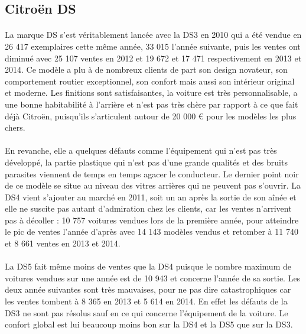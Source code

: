 \documentclass[12pt]{article}\usepackage[]{graphicx}\usepackage[]{color}
\begin{document}
\subsection{Citroën DS}

\paragraph{} La marque DS s'est véritablement lancée avec la DS3 en 2010 qui a
été vendue en 26 417 exemplaires cette même année, 33 015 l'année suivante,
puis les ventes ont diminué avec 25 107 ventes en 2012 et 19 672 et 17 471
respectivement en 2013 et 2014. Ce modèle a plu à de nombreux clients de part
son design novateur\cite{avis}, son comportement routier exceptionnel, son
confort mais aussi son intérieur original et moderne. Les finitions sont
satisfaisantes, la voiture est très personnalisable, a une bonne habitabilité à
l'arrière et n'est pas très chère par rapport à ce que fait déjà Citroën,
puisqu'ils s'articulent autour de 20 000 € pour les modèles les plus chers.

\paragraph{} En revanche, elle a quelques défauts comme l'équipement qui n'est
pas très développé, la partie plastique qui n'est pas d'une grande qualités et
des bruits parasites viennent de temps en temps agacer le conducteur. Le
dernier point noir de ce modèle se situe au niveau des vitres arrières qui ne
peuvent pas s'ouvrir. La DS4 vient s'ajouter au marché en 2011, soit un an après
la sortie de son aînée et elle ne suscite pas autant d'admiration chez les
clients, car les ventes n'arrivent pas à décoller : 10 757 voitures vendues lors
de la première année, pour atteindre le pic de ventes l'année d'après avec 14
143 modèles vendus et retomber à 11 740 et 8 661 ventes en 2013 et 2014.

\paragraph{} La DS5 fait même moins de ventes que la DS4 puisque le nombre
maximum de voitures vendues sur une année est de 10 943 et concerne l'année de
sa sortie. Les deux année suivantes sont très mauvaises, pour ne pas dire
catastrophiques car les ventes tombent à 8 365 en 2013 et 5 614 en 2014. En
effet les défauts de la DS3 ne sont pas résolus sauf en ce qui concerne
l'équipement de la voiture. Le confort global est lui beaucoup moins bon sur la
DS4 et la DS5 que sur la DS3.
\end{document}
